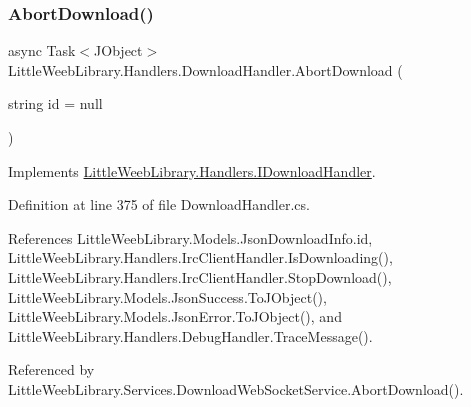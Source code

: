 \subsubsection{\texorpdfstring{Abort\+Download()}{AbortDownload()}}
{\footnotesize\ttfamily async Task$<$J\+Object$>$ Little\+Weeb\+Library.\+Handlers.\+Download\+Handler.\+Abort\+Download (\begin{DoxyParamCaption}\item[{string}]{id = {\ttfamily null} }\end{DoxyParamCaption})}



Implements \mbox{\hyperlink{interface_little_weeb_library_1_1_handlers_1_1_i_download_handler_ad0282431f67c1c1b27ae85ec4430d547}{Little\+Weeb\+Library.\+Handlers.\+I\+Download\+Handler}}.



Definition at line 375 of file Download\+Handler.\+cs.



References Little\+Weeb\+Library.\+Models.\+Json\+Download\+Info.\+id, Little\+Weeb\+Library.\+Handlers.\+Irc\+Client\+Handler.\+Is\+Downloading(), Little\+Weeb\+Library.\+Handlers.\+Irc\+Client\+Handler.\+Stop\+Download(), Little\+Weeb\+Library.\+Models.\+Json\+Success.\+To\+J\+Object(), Little\+Weeb\+Library.\+Models.\+Json\+Error.\+To\+J\+Object(), and Little\+Weeb\+Library.\+Handlers.\+Debug\+Handler.\+Trace\+Message().



Referenced by Little\+Weeb\+Library.\+Services.\+Download\+Web\+Socket\+Service.\+Abort\+Download().


